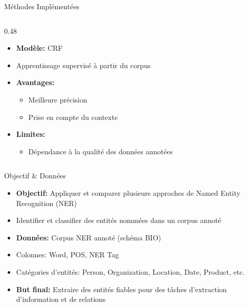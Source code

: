 \documentclass[10pt]{beamer}
\begin{document}
\begin{frame}{Méthodes Implémentées}
\begin{columns}[T]
        \begin{column}{0.48\textwidth}
            \begin{tcolorbox}[colback=middledered!20, colframe=darkred, title=Machine Learning NER]
                \begin{itemize}
                    \item \textbf{Modèle:} CRF
                    \item Apprentissage supervisé à partir du corpus
                    \item \textbf{Avantages:}
                    \begin{itemize}
                        \item Meilleure précision
                        \item Prise en compte du contexte
                    \end{itemize}
                    \item \textbf{Limites:}
                    \begin{itemize}
                        \item Dépendance à la qualité des données annotées
                    \end{itemize}
                \end{itemize}
            \end{tcolorbox}
        \end{column}
    \end{columns}
\end{frame}

 
\begin{frame}{Objectif \& Données}
    \vspace{-0.5cm}
    
    \begin{tcolorbox}[colback=lightred!20, colframe=redforsnnu, title=]
        \begin{itemize}
            \item \textbf{Objectif:} Appliquer et comparer plusieurs approches de Named Entity Recognition (NER)
            \item Identifier et classifier des entités nommées dans un corpus annoté
            \item \textbf{Données:} Corpus NER annoté (schéma BIO)
            \item Colonnes: Word, POS, NER Tag
            \item Catégories d'entités: Person, Organization, Location, Date, Product, etc.
            \item \textbf{But final:} Extraire des entités fiables pour des tâches d'extraction d'information et de relations
        \end{itemize}
    \end{tcolorbox}
    
\end{frame}
\end{document}
